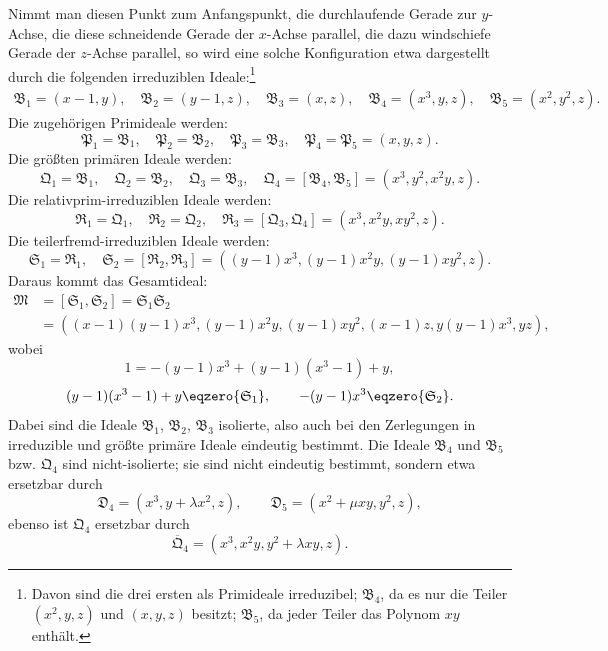 \documentclass[11pt]{article}
\newcommand{\ideal}[1]{\mathfrak{#1}}
\begin{document}
Nimmt man diesen Punkt zum Anfangspunkt, die durchlaufende Gerade zur $y$-Achse, die diese schneidende Gerade der $x$-Achse parallel, die dazu windschiefe Gerade der $z$-Achse parallel, so wird eine solche Konfiguration etwa dargestellt durch die folgenden irreduziblen Ideale:\footnote{Davon sind die drei ersten als Primideale irreduzibel; $\ideal B_4$, da es nur die Teiler $(x^2,y,z)$ und $(x,y,z)$ besitzt; $\ideal B_5$, da jeder Teiler das Polynom $xy$ enthält.}
\[
\begin{gathered}
 \ideal B_1=(x-1,y),\quad
 \ideal B_2=(y-1,z),\quad
 \ideal B_3=(x,z),\quad
 \ideal B_4=(x^3,y,z),\quad
 \ideal B_5=(x^2,y^2,z). 
\end{gathered}
\]
Die zugehörigen Primideale werden:
\[
 \ideal P_1=\ideal B_1,
 \quad \ideal P_2=\ideal B_2,
 \quad \ideal P_3=\ideal B_3,
 \quad \ideal P_4=\ideal P_5=(x,y,z).
\]
Die größten primären Ideale werden:
\[
 \ideal Q_1=\ideal B_1,
 \quad \ideal Q_2=\ideal B_2,
 \quad \ideal Q_3=\ideal B_3,
 \quad \ideal Q_4=[\ideal B_4,\ideal B_5]=(x^3,y^2,x^2y,z).
\]
Die relativprim-irreduziblen Ideale werden:
\[
 \ideal R_1=\ideal Q_1,
 \quad \ideal R_2=\ideal Q_2,
 \quad \ideal R_3=[\ideal Q_3,\ideal Q_4]=(x^3,x^2y,xy^2,z).
\]
Die teilerfremd-irreduziblen Ideale werden:
\[
 \ideal S_1=\ideal R_1,
 \quad
 \ideal S_2=[\ideal R_2,\ideal R_3]=((y-1)x^3,(y-1)x^2y,(y-1)xy^2,z).
\]
Daraus kommt das Gesamtideal:
\[
\begin{aligned}
 \ideal M&=[\ideal S_1,\ideal S_2]=\ideal S_1\ideal S_2 \\
 &=((x-1)(y-1)x^3,(y-1)x^2y,(y-1)xy^2,(x-1)z,y(y-1)x^3,yz),
\end{aligned}
\]
wobei
\[
 1=-(y-1)x^3+(y-1)(x^3-1)+y,
\]
\[
 (y-1)(x^3-1)+y\eqzero{\ideal S_1},
 \qquad -(y-1)x^3\eqzero{\ideal S_2}.
\]
Dabei sind die Ideale $\ideal B_1$, $\ideal B_2$, $\ideal B_3$ isolierte, also auch bei den Zerlegungen in irreduzible und größte primäre Ideale eindeutig bestimmt. Die Ideale $\ideal B_4$ und $\ideal B_5$ bzw. $\ideal Q_4$ sind nicht-isolierte; sie sind nicht eindeutig bestimmt, sondern etwa ersetzbar durch
\[
 \ideal D_4=(x^3,y+\lambda x^2,z),
 \qquad
 \ideal D_5=(x^2+\mu xy,y^2,z),
\]
ebenso ist $\ideal Q_4$ ersetzbar durch
\[
 \overline{\ideal Q}_4=(x^3,x^2y,y^2+\lambda xy,z).
\]
\end{document}
